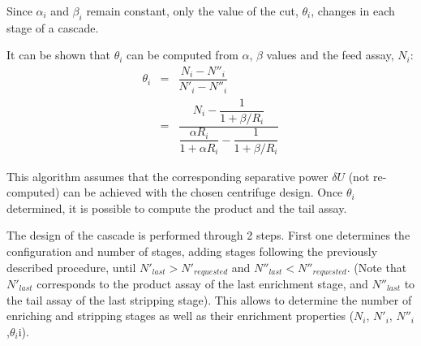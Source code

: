 \documentclass{anstrans}
\begin{document}
Since $\alpha_{i}$ and $\beta_{i}$ remain constant, only the value of the cut,
$\theta_{i}$, changes in each stage of a cascade.

It can be shown that $\theta_{i}$ can be computed from $\alpha$,
$\beta$ values and the feed assay, $N_{i}$:
\begin{eqnarray}
    \theta_{i} &=& \dfrac{N_{i} - N''_{i}}{N'_{i}-N''_{i}}\nonumber\\
           &=& \dfrac{N_{i} - \dfrac{1}{1 + \beta/R_{i}}}{ \dfrac{\alpha R_{i}}{1 + \alpha R_{i}} -
           \dfrac{1}{1 + \beta/R_{i}}}
\end{eqnarray}

This algorithm assumes that the corresponding separative power $\delta U$ (not
re-computed) can be achieved with the chosen centrifuge design. Once
$\theta_{i}$ determined, it is possible to compute the product and the tail
assay.

The design of the cascade is performed through 2 steps. First one determines the
configuration and number of stages, adding stages following the previously
described procedure, until $N'_{last} > N'_{requested}$ and $N''_{last} <
N''_{requested}$. (Note that $N'_{last}$ corresponds to the product assay of the
last enrichment stage, and $N''_{last}$ to the tail assay of the last stripping
stage). This allows to determine the number of enriching and stripping stages as
well as their enrichment properties ($N_{i}$, $N'_{i}$,
$N''_{i}$,$\theta_{i}$i).
\end{document}
